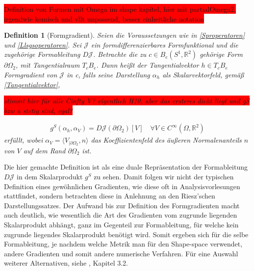 \documentclass[bibliography=totoc,12pt,a4paper]{scrartcl}
\theoremstyle{exampstyle}
\newtheorem{defi}{Definition}%
\numberwithin{equation}{section}
\begin{document}
\colorbox{red}{Definition von Formen mit Omega im shape kapitel, hier mit partialOmega2, irgendwie komisch und vllt unpassend, besser einheitliche notation}

\begin{defi}[Formgradient]\label{Formgradientdefi}
Seien die Voraussetzungen wie in \ref{Sproperatoren} und \ref{Llsgsoperatoren}.
Sei $\mathcal{J}$ ein formdifferenzierbares Formfunktional und die zugehörige Formableitung $D\mathcal{J}$. Betrachte die zu $c\in B_e(S^1,\mathbb{R}^2)$ gehörige Form $\partial\Omega_2$, mit Tangentialraum $T_cB_e$. Dann heißt der Tangentialvektor $h\in T_cB_e$ \textit{Formgradient von} $\mathcal{J}$ \textit{in c}, falls seine Darstellung $\alpha_h$ als Skalarvektorfeld, gemäß \ref{Tangentialvektor},

\colorbox{red}{stimmt hier für alle Cinfty V? eigentlich H10, aber das ersteres dicht liegt und gS bzw a stetig sind, egal?}

\begin{align}\label{Gradientengleichung}
	g^S(\alpha_h, \alpha_V) = D\mathcal{J}(\partial \Omega_2)[V] \quad \forall V\in C^\infty(\Omega,\mathbb{R}^2)
\end{align}
erfüllt, wobei $\alpha_V = \langle V_{\vert \partial\Omega_2}, n\rangle$ das Koeffizientenfeld des äußeren Normalenanteils $n$ von $V$ auf dem Rand $\partial \Omega_2$ ist.

\end{defi}

Die hier gemachte Definition ist als eine duale Repräsentation der Formableitung $D\mathcal{J}$ in dem Skalarprodukt $g^S$ zu sehen. Damit folgen wir nicht der typischen Definition eines gewöhnlichen Gradienten, wie diese oft in Analysisvorlesungen stattfindet, sondern betrachten diese in Anlehnung an den  Riesz'schen Darstellungssatzes. Der Aufwand bis zur Definition des Formgradienten macht auch deutlich, wie wesentlich die Art des Gradienten vom zugrunde liegenden Skalarprodukt abhängt, ganz im Gegenteil zur Formableitung, für welche kein zugrunde liegendes Skalarprodukt benötigt wird. Somit ergeben sich für die selbe Formableitung, je nachdem welche Metrik man für den Shape-space verwendet, andere Gradienten und somit andere numerische Verfahren. Für eine Auswahl weiterer Alternativen, siehe \cite{shape_space}, Kapitel 3.2.
\end{document}
